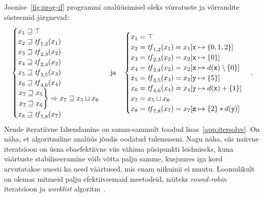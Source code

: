 \documentclass[../thesis.tex]{subfiles}
\begin{document}
Joonise~\ref{fig:prog-if} programmi analüüsimisel oleks võrratuste ja võrrandite süsteemid järgnevad:
\[
	\begin{cases}
		x_1 \sqgeq \top \\
		x_2 \sqgeq \tf_{1,2}(x_1) \\
		x_3 \sqgeq \tf_{2,3}(x_2) \\
		x_4 \sqgeq \tf_{2,4}(x_2) \\
		x_5 \sqgeq \tf_{3,5}(x_3) \\
		x_6 \sqgeq \tf_{4,6}(x_4) \\
		\begin{rcases*}
			x_7 \sqgeq x_5 \\
			x_7 \sqgeq x_6
		\end{rcases*} \Rightarrow x_7 \sqgeq x_5 \sqcup x_6 \\
		x_8 \sqgeq \tf_{7,8}(x_7)
	\end{cases}
	\  \text{ja} \quad
	\begin{cases}
		x_1 = \top \\
		x_2 = \tf_{1,2}(x_1) = x_1[\texttt{x} \mapsto \{0, 1, 2\}] \\
		x_3 = \tf_{2,3}(x_2) = x_2[\texttt{x} \mapsto \{0\}] \\
		x_4 = \tf_{2,4}(x_2) = x_2[\texttt{x} \mapsto d(\texttt{x}) \setminus \{0\}] \\
		x_5 = \tf_{3,5}(x_3) = x_3[\texttt{y} \mapsto \{5\}] \\
		x_6 = \tf_{4,6}(x_4) = x_4[\texttt{y} \mapsto d(\texttt{x}) + \{1\}] \\
		x_7 = x_5 \sqcup x_6 \\
		x_8 = \tf_{7,8}(x_7) = x_7[\texttt{z} \mapsto \{2\} * d(\texttt{y})]
	\end{cases}.
\]
Nende iteratiivne lahendamine on samm-sammult toodud lisas~\ref{app:itersolve}.
On näha, et algoritmiline analüüs jõudis oodatud tulemuseni.
Nagu näha, siis naiivne iteratsioon on üsna ebaefektiivne viis vähima püsipunkti leidmiseks, kuna väärtuste stabiliseerumine võib võtta palju samme, kusjuures iga kord arvutatakse uuesti ka need väärtused, mis enam niikuinii ei muutu. Loomulikult on olemas mitmeid palju efektiivsemaid meetodeid, näiteks \textit{round-robin} iteratsioon ja \textit{worklist} algoritm~\cite[24,83]{seidl_foundations}.
\end{document}
